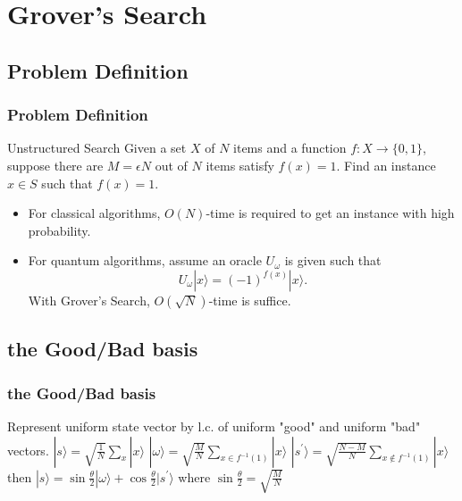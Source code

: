 \documentclass{beamer}
\newcommand{\<}{\langle}
\renewcommand{\>}{\rangle}
\begin{document}

\section{Grover's Search}

\subsection{Problem Definition}
\begin{frame}
\frametitle{Problem Definition}

\begin{block}{Unstructured Search}
Given a set $X$ of $N$ items and a function $f : X \to \{0,1\}$, \newline
suppose there are $M=\epsilon N$ out of $N$ items satisfy $f(x)=1$. \newline
Find an instance $x \in S$ such that $f(x)=1$. \newline
\end{block}

\begin{itemize}
    \item For classical algorithms, $O(N)$-time is required to get an instance with high probability.

    \item For quantum algorithms, assume an oracle $U_\omega$ is given such that 
$$
U_\omega|x\rangle = (-1)^{f(x)}|x\rangle .
$$
    With Grover's Search, $O(\sqrt{N})$-time is suffice.
\end{itemize}

\end{frame}


\subsection{the Good/Bad basis}
\begin{frame}
\frametitle{the Good/Bad basis}
Represent uniform state vector by l.c. of uniform "good" and uniform "bad" vectors. \newline
$|s\rangle = \sqrt{\frac{1}{N}}\sum_{x} |x\rangle$ \newline
$|\omega\rangle = \sqrt{\frac{M}{N}}\sum_{x \in f^{-1}(1)} |x\rangle$ \newline
$|s^{'}\rangle = \sqrt{\frac{N-M}{N}}\sum_{x \not \in f^{-1}(1)} |x\rangle$ \newline
then $|s\rangle = \sin\frac\theta2|\omega\rangle + \cos\frac\theta2|s^{'}\rangle$ where $\sin\frac\theta2 = \sqrt{\frac{M}{N}}$
\end{frame}
\end{document}
